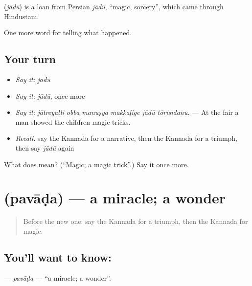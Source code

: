 \begin{cousinweb}
\textbf{} (\emph{jādū}) is a loan from Persian \emph{jādū}, \textquotedblleft{}magic, sorcery\textquotedblright{}, which came through Hindustani.
\end{cousinweb}

\begin{grammarlens}[title={What you've built}]
One more word for telling what happened.
\end{grammarlens}

\subsection*{Your turn}
\begin{itemize}
\raggedright
  \item \emph{Say it:} \emph{jādū}
  \item \emph{Say it:} \emph{jādū}, once more
  \item \emph{Say it:} \emph{jātreyalli obba manuṣya makkaḷige jādū tōrisidanu.} — At the fair a man showed the children magic tricks.
  \item \emph{Recall:} say the Kannada for a narrative, then the Kannada for a triumph, then say \emph{jādū} again
\end{itemize}

\begin{tcolorbox}[breakable,colback=teal!4,colframe=teal!35!black,title={Before you move on}]
What does  mean? (\textquotedblleft{}Magic; a magic trick\textquotedblright{}.) Say it once more.
\end{tcolorbox}
\section[\texorpdfstring{\kn{ಪವಾಡ} (pavāḍa)}{ಪವಾಡ (pavāḍa)}]{ (pavāḍa) — a miracle; a wonder}

\label{lesson:KA-C374-pavada}



\begin{quote}
Before the new one: say the Kannada for a triumph, then the Kannada for magic.
\end{quote}

\subsection*{You'll want to know: }
\textbf{} — \emph{pavāḍa} — \textquotedblleft{}a miracle; a wonder\textquotedblright{}.

